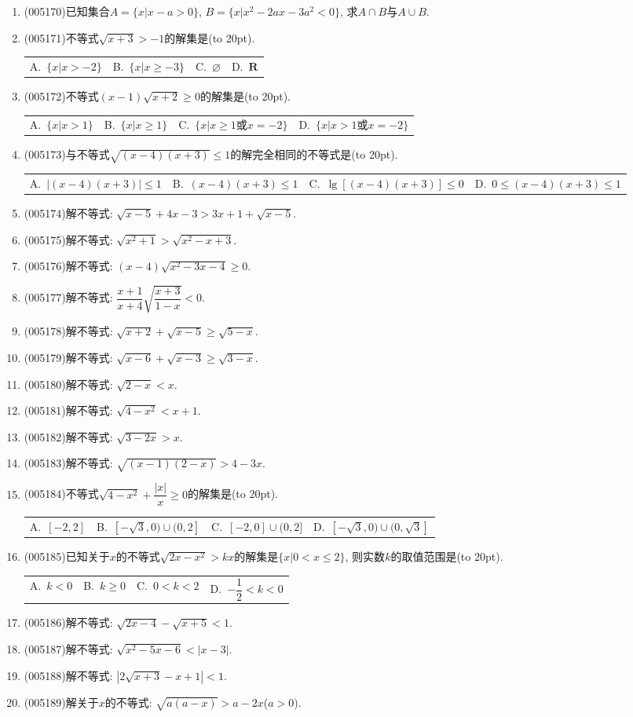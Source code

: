 \documentclass[10pt,a4paper]{article}
\newcommand{\bracket}[1]{(\hbox to #1pt{})}
\newcommand{\fourch}[4]{\par\begin{tabular}{p{.23\textwidth}p{.23\textwidth}p{.23\textwidth}p{.23\textwidth}}
A.~#1 &B.~#2& C.~#3& D.~#4
\end{tabular}}
\begin{document}
\begin{enumerate}[1.]
\item {\tiny (005170)}已知集合$A=\{x|x-a>0\}$, $B=\{x|x^2-2ax-3a^2<0\}$, 求$A\cap B$与$A\cup B$.
\item {\tiny (005171)}不等式$\sqrt{x+3}>-1$的解集是\bracket{20}.
\fourch{$\{x|x>-2\}$}{$\{x|x\ge -3\}$}{$\varnothing$}{$\mathbf{R}$}
\item {\tiny (005172)}不等式$(x-1)\sqrt{x+2}\ge 0$的解集是\bracket{20}.
\fourch{$\{x|x>1\}$}{$\{x|x\ge 1\}$}{$\{x|x\ge 1\text{或}x=-2\}$}{$\{x|x>1\text{或}x=-2\}$}
\item {\tiny (005173)}与不等式$\sqrt{(x-4)(x+3)}\le 1$的解完全相同的不等式是\bracket{20}.
\fourch{$|(x-4)(x+3)|\le 1$}{$(x-4)(x+3)\le 1$}{$\lg [ (x-4)(x+3) ]\le 0$}{$0\le (x-4)(x+3)\le 1$}
\item {\tiny (005174)}解不等式: $\sqrt{x-5}+4x-3>3x+1+\sqrt{x-5}$.
\item {\tiny (005175)}解不等式: $\sqrt{x^2+1}>\sqrt{x^2-x+3}$.
\item {\tiny (005176)}解不等式: $(x-4)\sqrt{x^2-3x-4}\ge 0$.
\item {\tiny (005177)}解不等式: $\dfrac{x+1}{x+4}\sqrt{\dfrac{x+3}{1-x}}<0$.
\item {\tiny (005178)}解不等式: $\sqrt{x+2}+\sqrt{x-5}\ge \sqrt{5-x}$.
\item {\tiny (005179)}解不等式: $\sqrt{x-6}+\sqrt{x-3}\ge \sqrt{3-x}$.
\item {\tiny (005180)}解不等式: $\sqrt{2-x}<x$.
\item {\tiny (005181)}解不等式: $\sqrt{4-x^2}<x+1$.
\item {\tiny (005182)}解不等式: $\sqrt{3-2x}>x$.
\item {\tiny (005183)}解不等式: $\sqrt{(x-1)(2-x)}>4-3x$.
\item {\tiny (005184)}不等式$\sqrt{4-x^2}+\dfrac{|x|}x\ge 0$的解集是\bracket{20}.
\fourch{$[-2,2]$}{$[-\sqrt 3,0)\cup (0,2]$}{$[-2,0]\cup (0,2]$}{$[-\sqrt 3,0)\cup (0,\sqrt 3]$}
\item {\tiny (005185)}已知关于$x$的不等式$\sqrt{2x-x^2}>kx$的解集是$\{x|0<x\le 2\}$, 则实数$k$的取值范围是\bracket{20}.
\fourch{$k<0$}{$k\ge 0$}{$0<k<2$}{$-\dfrac 12<k<0$}
\item {\tiny (005186)}解不等式: $\sqrt{2x-4}-\sqrt{x+5}<1$.
\item {\tiny (005187)}解不等式: $\sqrt{x^2-5x-6}<|x-3|$.
\item {\tiny (005188)}解不等式: $|2\sqrt{x+3}-x+1|<1$.
\item {\tiny (005189)}解关于$x$的不等式: $\sqrt{a(a-x)}>a-2x$($a>0$).
\end{enumerate}
\end{document}
